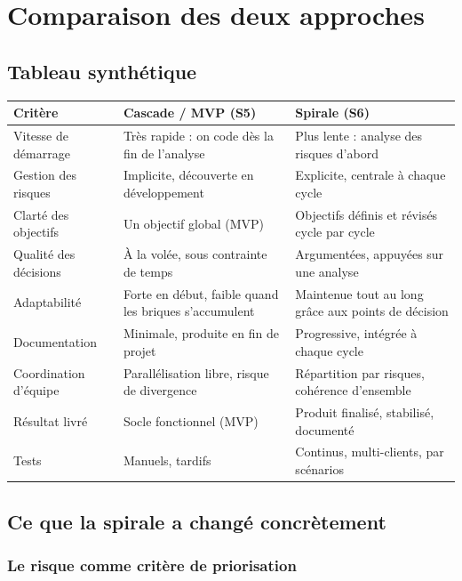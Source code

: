\documentclass[11pt,a4paper]{report}
\begin{document}
\chapter{Comparaison des deux approches}

\section{Tableau synthétique}

\begin{longtable}{L{0.24\textwidth} L{0.35\textwidth} L{0.35\textwidth}}
\toprule
{}
\textbf{Critère} & \textbf{Cascade / MVP (S5)} & \textbf{Spirale (S6)} \\
\midrule
Vitesse de démarrage & Très rapide : on code dès la fin de l'analyse & Plus lente : analyse des risques d'abord \\
Gestion des risques & Implicite, découverte en développement & Explicite, centrale à chaque cycle \\
Clarté des objectifs & Un objectif global (MVP) & Objectifs définis et révisés cycle par cycle \\
Qualité des décisions & À la volée, sous contrainte de temps & Argumentées, appuyées sur une analyse \\
Adaptabilité & Forte en début, faible quand les briques s'accumulent & Maintenue tout au long grâce aux points de décision \\
Documentation & Minimale, produite en fin de projet & Progressive, intégrée à chaque cycle \\
Coordination d'équipe & Parallélisation libre, risque de divergence & Répartition par risques, cohérence d'ensemble \\
Résultat livré & Socle fonctionnel (MVP) & Produit finalisé, stabilisé, documenté \\
Tests & Manuels, tardifs & Continus, multi-clients, par scénarios \\
\bottomrule
\end{longtable}

\section{Ce que la spirale a changé concrètement}

\subsection{Le risque comme critère de priorisation}
\end{document}
